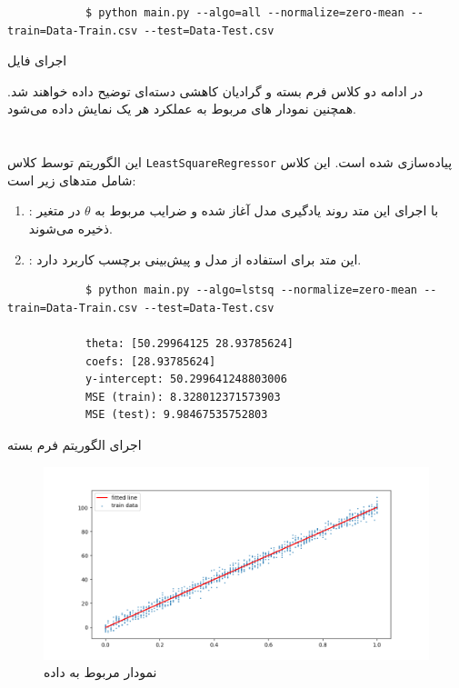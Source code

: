 \documentclass[]{article}
\begin{document}
\begin{code}
	\begin{latin}
		\begin{verbatim}
			$ python main.py --algo=all --normalize=zero-mean --train=Data-Train.csv --test=Data-Test.csv 
		\end{verbatim}
	\end{latin}
	\caption{اجرای فایل }
	\label{image:run all}
\end{code}
در ادامه دو کلاس فرم بسته و گرادیان کاهشی دسته‌ای توضیح داده خواهند شد. همچنین نمودار های مربوط به عملکرد هر یک نمایش داده می‌شود.

\part{}
این الگوریتم توسط کلاس \texttt{LeastSquareRegressor} پیاده‌سازی شده است. این کلاس شامل متدهای زیر است:
\begin{enumerate}
	\item {}: با اجرای این متد روند یادگیری مدل آغاز شده و ضرایب مربوط به $\theta$ در متغیر  ذخیره می‌شوند.
	\item {}: این متد برای استفاده از مدل و پیش‌بینی برچسب کاربرد دارد.
\end{enumerate}

\begin{code}
	\begin{latin}
		\begin{verbatim}
			$ python main.py --algo=lstsq --normalize=zero-mean --train=Data-Train.csv --test=Data-Test.csv 
			
			theta: [50.29964125 28.93785624]
			coefs: [28.93785624]
			y-intercept: 50.299641248803006
			MSE (train): 8.328012371573903
			MSE (test): 9.98467535752803
		\end{verbatim}
	\end{latin}
	\caption{اجرای الگوریتم فرم بسته}
	\label{image:run lstsq}
\end{code}

\begin{figure}
	\centering
	\includegraphics[width=1\linewidth]{lstsq-train}
	\caption{نمودار مربوط به داده }
	\label{fig:lstsq-train}
\end{figure}
\end{document}
